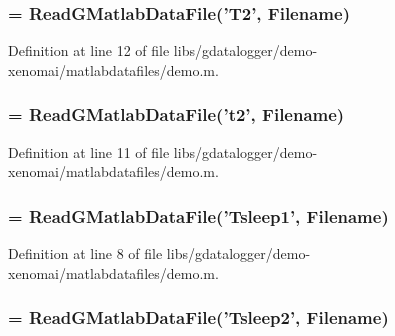 \subsubsection[{T2}]{ = ReadGMatlabDataFile('{\bf T2}', {\bf Filename})}\label{libs_2gdatalogger_2demo-xenomai_2matlabdatafiles_2demo_8m_a5a30d530a77bc992810b0c24a3e8f550}


Definition at line 12 of file libs/gdatalogger/demo-\/xenomai/matlabdatafiles/demo.m.
\subsubsection[{t2}]{ = ReadGMatlabDataFile('{\bf t2}', {\bf Filename})}\label{libs_2gdatalogger_2demo-xenomai_2matlabdatafiles_2demo_8m_a24aeadb733f27244ec14e4cba82eeee9}


Definition at line 11 of file libs/gdatalogger/demo-\/xenomai/matlabdatafiles/demo.m.
\subsubsection[{Tsleep1}]{ = ReadGMatlabDataFile('{\bf Tsleep1}', {\bf Filename})}\label{libs_2gdatalogger_2demo-xenomai_2matlabdatafiles_2demo_8m_a9d043c968549942ad67a7fb2cb6e3b25}


Definition at line 8 of file libs/gdatalogger/demo-\/xenomai/matlabdatafiles/demo.m.
\subsubsection[{Tsleep2}]{ = ReadGMatlabDataFile('{\bf Tsleep2}', {\bf Filename})}\label{libs_2gdatalogger_2demo-xenomai_2matlabdatafiles_2demo_8m_a454db3e44c5362e99f9bcff47d47789e}


